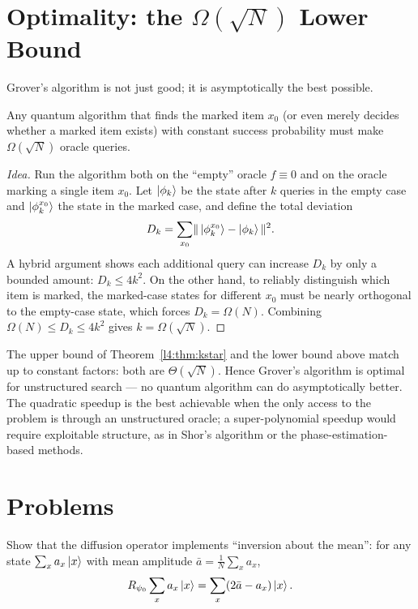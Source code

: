 \section{Optimality: the \texorpdfstring{$\Omega(\sqrt N)$}{Omega(sqrt N)} Lower Bound}

Grover's algorithm is not just good; it is asymptotically the best possible.

\begin{theorem}
Any quantum algorithm that finds the marked item $x_0$ (or even merely decides
whether a marked item exists) with constant success probability must make
$\Omega(\sqrt N)$ oracle queries.
\end{theorem}

\begin{proof}[Idea]
Run the algorithm both on the ``empty'' oracle $f\equiv0$ and on the oracle marking
a single item $x_0$. Let $\ket{\phi_k}$ be the state after $k$ queries in the
empty case and $\ket{\phi_k^{x_0}}$ the state in the marked case, and define the
total deviation
\[
  D_k=\sum_{x_0}\lVert\,\ket{\phi_k^{x_0}}-\ket{\phi_k}\,\rVert^{2}.
\]
A hybrid argument shows each additional query can increase $D_k$ by only a bounded
amount: $D_k\le 4k^{2}$. On the other hand, to reliably distinguish which item is
marked, the marked-case states for different $x_0$ must be nearly orthogonal to the
empty-case state, which forces $D_k=\Omega(N)$. Combining
$\Omega(N)\le D_k\le 4k^{2}$ gives $k=\Omega(\sqrt N)$.
\end{proof}

\begin{remark}
The upper bound of Theorem~\ref{l4:thm:kstar} and the lower bound above match up to
constant factors: both are $\Theta(\sqrt N)$. Hence Grover's algorithm is optimal
for unstructured search --- no quantum algorithm can do asymptotically better. The
quadratic speedup is the best achievable when the only access to the problem is
through an unstructured oracle; a super-polynomial speedup would require exploitable
structure, as in Shor's algorithm or the phase-estimation-based methods.
\end{remark}

\section{Problems}

\begin{exercise}
\label{l4:ex:invmean}
Show that the diffusion operator implements ``inversion about the mean'': for any
state $\sum_x a_x\ket{x}$ with mean amplitude $\bar a=\tfrac1N\sum_x a_x$,
\[
  R_{\psi_0}\sum_x a_x\ket{x}=\sum_x(2\bar a-a_x)\ket{x}.
\]
\end{exercise}

